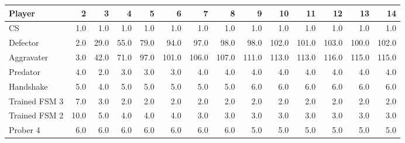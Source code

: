\begin{tabular}{lrrrrrrrrrrrrr}
\toprule
        Player &     2 &     3 &     4 &     5 &      6 &      7 &      8 &      9 &     10 &     11 &     12 &     13 &     14 \\
\midrule
            CS &   1.0 &   1.0 &   1.0 &   1.0 &    1.0 &    1.0 &    1.0 &    1.0 &    1.0 &    1.0 &    1.0 &    1.0 &    1.0 \\
      Defector &   2.0 &  29.0 &  55.0 &  79.0 &   94.0 &   97.0 &   98.0 &   98.0 &  102.0 &  101.0 &  103.0 &  100.0 &  102.0 \\
    Aggravater &   3.0 &  42.0 &  71.0 &  97.0 &  101.0 &  106.0 &  107.0 &  111.0 &  113.0 &  113.0 &  116.0 &  115.0 &  115.0 \\
      Predator &   4.0 &   2.0 &   3.0 &   3.0 &    3.0 &    4.0 &    4.0 &    4.0 &    4.0 &    4.0 &    4.0 &    4.0 &    4.0 \\
     Handshake &   5.0 &   4.0 &   5.0 &   5.0 &    5.0 &    5.0 &    5.0 &    6.0 &    6.0 &    6.0 &    6.0 &    6.0 &    6.0 \\
 Trained FSM 3 &   7.0 &   3.0 &   2.0 &   2.0 &    2.0 &    2.0 &    2.0 &    2.0 &    2.0 &    2.0 &    2.0 &    2.0 &    2.0 \\
 Trained FSM 2 &  10.0 &   5.0 &   4.0 &   4.0 &    4.0 &    3.0 &    3.0 &    3.0 &    3.0 &    3.0 &    3.0 &    3.0 &    3.0 \\
      Prober 4 &   6.0 &   6.0 &   6.0 &   6.0 &    6.0 &    6.0 &    6.0 &    5.0 &    5.0 &    5.0 &    5.0 &    5.0 &    5.0 \\
\bottomrule
\end{tabular}
